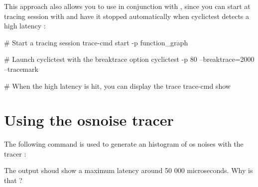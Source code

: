This approach also allows you to use  in conjunction with ,
since you can start at tracing session with  and have it
stopped automatically when cyclictest detects a high latency :

\begin{bashinput}
	# Start a tracing session
	trace-cmd start -p function_graph

	# Launch cyclictest with the breaktrace option
	cyclictest -p 80 --breaktrace=2000 --tracemark

	# When the high latency is hit, you can display the trace
	trace-cmd show
\end{bashinput}

\section{Using the osnoise tracer}

The following command is used to generate an histogram of os noises with the 
 tracer :


The output shoud show a maximum latency around 50 000 microseconds. Why is that ?

